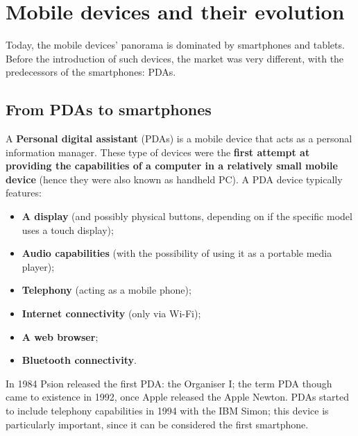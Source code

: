 \section{Mobile devices and their evolution}
Today, the mobile devices' panorama is dominated by smartphones and tablets. Before the introduction of such devices, the market was very different, with the predecessors of the smartphones: PDAs.

\subsection{From PDAs to smartphones}
A \textbf{Personal digital assistant} (PDAs) is a mobile device that acts as a personal information manager. These type of devices were the \textbf{first attempt at providing the capabilities of a computer in a relatively small mobile device} (hence they were also known as handheld PC). A PDA device typically features:
\begin{itemize}
    \item \textbf{A display} (and possibly physical buttons, depending on if the specific model uses a touch display);
    \item \textbf{Audio capabilities} (with the possibility of using it as a portable media player);
    \item \textbf{Telephony} (acting as a mobile phone);
    \item \textbf{Internet connectivity} (only via Wi-Fi);
    \item \textbf{A web browser};
    \item \textbf{Bluetooth connectivity}.
\end{itemize}

In 1984 Psion released the first PDA: the Organiser I; the term PDA though came to existence in 1992, once Apple released the Apple Newton. PDAs started to include telephony capabilities in 1994 with the IBM Simon; this device is particularly important, since it can be considered the first smartphone.
\vspace{5mm}

